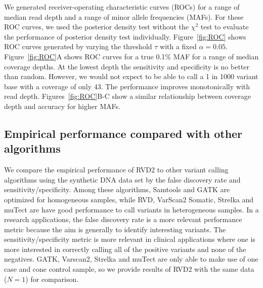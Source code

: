 \documentclass{bioinfo}
\begin{document}
We generated receiver-operating characteristic curves (ROCs) for a range of median read depth and a range of minor allele frequencies (MAFs). For these ROC curves, we used the posterior density test without the $\chi^2$ test to evaluate the performance of posterior density test individually. Figure~\ref{fig:ROC} shows ROC curves generated by varying the threshold $\tau$ with a fixed $\alpha=0.05$. Figure~\ref{fig:ROC}A shows ROC curves for a true 0.1\% MAF for a range of median coverage depths. At the lowest depth the sensitivity and specificity is no better than random. However, we would not expect to be able to call a 1 in 1000 variant base with a coverage of only 43. The performance improves monotonically with read depth. Figures~\ref{fig:ROC}B-C show a similar relationship between coverage depth and accuracy for higher MAFs.



\subsection{Empirical performance compared with other algorithms}\label{sec:comparison}

We compare the empirical performance of RVD2 to other variant calling algorithms using the synthetic DNA data set by the false discovery rate and sensitivity/specificity. Among these algorithms, Samtools and GATK are optimized for homogeneous samples, while RVD, VarScan2 Somatic, Strelka and muTect are have good performance to call variants in heterogeneous samples. In a research applications, the false discovery rate is a more relevant performance metric because the aim is generally to identify interesting variants. The sensitivity/specificity metric is more relevant in clinical applications where one is more interested in correctly calling all of the positive variants and none of the negatives. GATK, Varscan2, Strelka and muTect are only able to make use of one case and cone control sample, so we provide results of RVD2 with the same data ($N=1$) for comparison.




\end{document}
